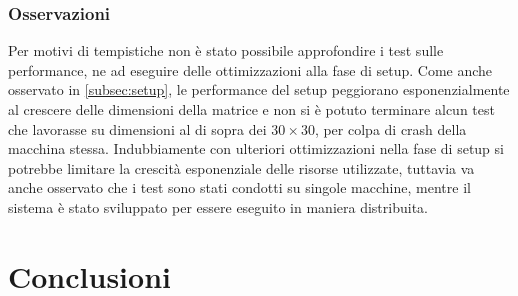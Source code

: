 \documentclass[12pt, a4paper]{report}
\begin{document}
\subsection{Osservazioni}

Per motivi di tempistiche non \`e stato possibile approfondire i test sulle performance, ne ad eseguire delle ottimizzazioni alla fase di setup. Come anche osservato in \ref{subsec:setup}, le performance del setup peggiorano esponenzialmente al crescere delle dimensioni della matrice e non si \`e potuto terminare alcun test che lavorasse su dimensioni al di sopra dei $30 \times 30$, per colpa di crash della macchina stessa. Indubbiamente con ulteriori ottimizzazioni nella fase di setup si potrebbe limitare la crescit\`a esponenziale delle risorse utilizzate, tuttavia va anche osservato che i test sono stati condotti su singole macchine, mentre il sistema \`e stato sviluppato per essere eseguito in maniera distribuita.

\chapter{Conclusioni}
\end{document}
